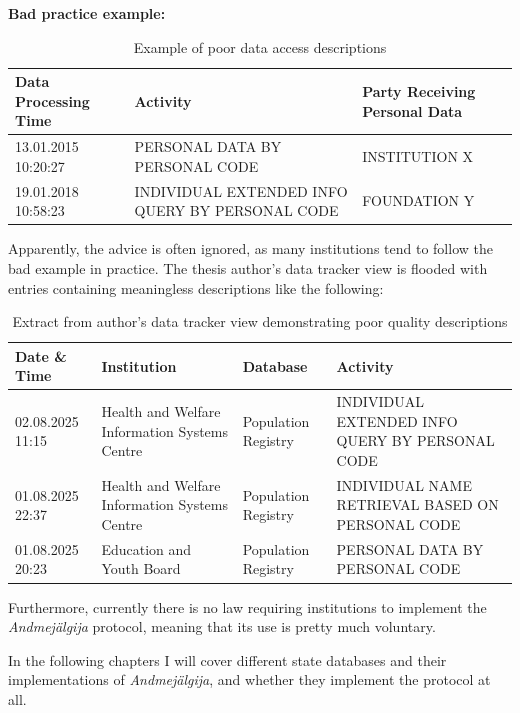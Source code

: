\textbf{Bad practice example:}

\begin{table}[H]
\centering
\begin{tabular}{|p{3cm}|p{6cm}|p{4cm}|}
\hline
\textbf{Data Processing Time} & \textbf{Activity} & \textbf{Party Receiving Personal Data} \\
\hline
13.01.2015 10:20:27 & PERSONAL DATA BY PERSONAL CODE & INSTITUTION X \\
\hline
19.01.2018 10:58:23 & INDIVIDUAL EXTENDED INFO QUERY BY PERSONAL CODE & FOUNDATION Y \\
\hline
\end{tabular}
\caption{Example of poor data access descriptions}
\end{table}

Apparently, the advice is often ignored, as many institutions tend to follow the bad example in practice. The thesis author's data tracker view is flooded with entries containing meaningless descriptions like the following:

\begin{table}[H]
\centering
\begin{tabular}{|p{2.5cm}|p{5cm}|p{3cm}|p{3.5cm}|}
\hline
\textbf{Date \& Time} & \textbf{Institution} & \textbf{Database} & \textbf{Activity} \\
\hline
02.08.2025 11:15 & Health and Welfare Information Systems Centre & Population Registry & INDIVIDUAL EXTENDED INFO QUERY BY PERSONAL CODE \\
\hline
01.08.2025 22:37 & Health and Welfare Information Systems Centre & Population Registry & INDIVIDUAL NAME RETRIEVAL BASED ON PERSONAL CODE \\
\hline
01.08.2025 20:23 & Education and Youth Board & Population Registry & PERSONAL DATA BY PERSONAL CODE \\
\hline
\end{tabular}
\caption{Extract from author's data tracker view demonstrating poor quality descriptions}
\end{table}

Furthermore, currently there is no law requiring institutions to implement the \textit{Andmejälgija} protocol, meaning that its use is pretty much voluntary.

In the following chapters I will cover different state databases and their implementations of \textit{Andmejälgija}, and whether they implement the protocol at all.